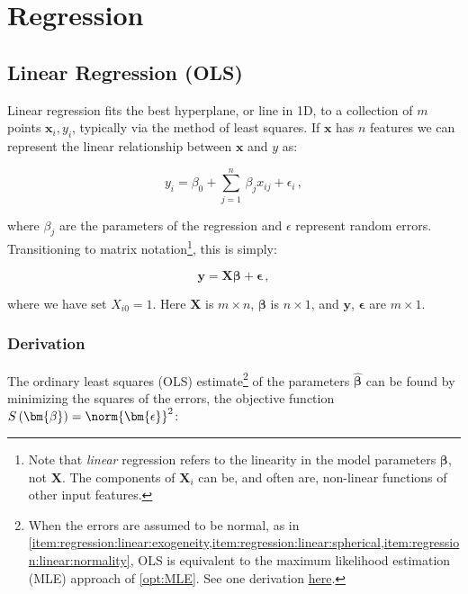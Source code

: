 \chapter{Regression}
\label{chap:regression}

\section{Linear Regression (OLS)}
\label{regression:linear}

Linear regression fits the best hyperplane, or line in 1D,
to a collection of $m$ points $\mathbf{x}_{i}, y_{i}$,
typically via the method of least squares.
If $\mathbf{x}$ has $n$ features we can represent the
linear relationship between $\mathbf{x}$ and $y$ as:

\begin{equation}\label{eq:linear:one_point}
y_{i} = \beta_{0} + \sum_{j=1}^{n}\, \beta_{j} x_{ij} + \epsilon_{i}\,,
\end{equation}

\noindent where $\beta_{j}$ are the parameters of the regression
and $\epsilon$ represent random errors.
Transitioning to matrix notation\footnote{Note
that \textit{linear} regression refers to the linearity in the model parameters
$\bm{\beta}$, not $\mathbf{X}$.
The components of $\mathbf{X}_{i}$ can be, and often are,
non-linear functions of other input features.}, this is simply:

\begin{equation}\label{eq:linear:matrix}
\mathbf{y} = \mathbf{X} \bm{\beta} + \bm{\epsilon}\,,
\end{equation}

\noindent where we have set $X_{i0} =1$.
Here $\mathbf{X}$ is $m \times n$,
$\bm{\beta}$ is $n \times 1$,
and $\mathbf{y}$, $\bm{\epsilon}$ are $m \times 1$.

\subsection{Derivation}
\label{regression:linear:derivation}

The ordinary least squares (OLS) estimate\footnote{When
the errors are assumed to be normal,
as in \cref{item:regression:linear:exogeneity,item:regression:linear:spherical,item:regression:linear:normality},
OLS is equivalent to the maximum likelihood estimation (MLE) approach of \cref{opt:MLE}.
See one derivation \href{https://machinelearningmastery.com/linear-regression-with-maximum-likelihood-estimation/}{here}.} of
the parameters $\hat{\bm{\beta}}$
can be found by minimizing the squares of the errors,
\ie the objective function $S\left(\bm{\beta}\right) = \norm{\bm{\epsilon}}^{2}$:

